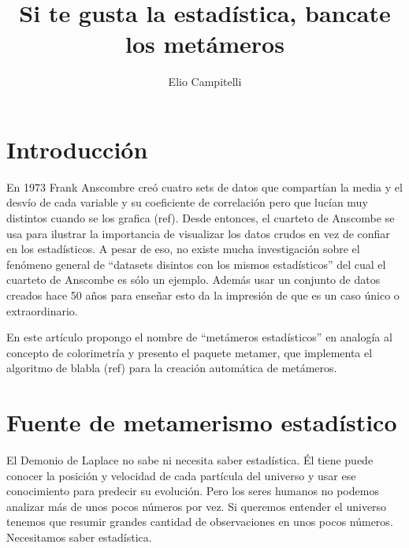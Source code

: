 \documentclass[runningheads,spanish]{llncs}
\begin{document}
%
\title{Si te gusta la estadística, bancate los metámeros}
%
%
\author{
Elio Campitelli }



%
\maketitle
%

 



\section{Introducción}

En 1973 Frank Anscombre creó cuatro sets de datos que compartían la
media y el desvío de cada variable y su coeficiente de correlación pero
que lucían muy distintos cuando se los grafica (ref). Desde entonces, el
cuarteto de Anscombe se usa para ilustrar la importancia de visualizar
los datos crudos en vez de confiar en los estadísticos. A pesar de eso,
no existe mucha investigación sobre el fenómeno general de ``datasets
disintos con los mismos estadísticos'' del cual el cuarteto de Anscombe
es sólo un ejemplo. Además usar un conjunto de datos creados hace 50
años para enseñar esto da la impresión de que es un caso único o
extraordinario.

En este artículo propongo el nombre de ``metámeros estadísticos'' en
analogía al concepto de colorimetría y presento el paquete metamer, que
implementa el algoritmo de blabla (ref) para la creación automática de
metámeros.

\section{Fuente de metamerismo estadístico}

El Demonio de Laplace no sabe ni necesita saber estadística. Él tiene
puede conocer la posición y velocidad de cada partícula del universo y
usar ese conocimiento para predecir su evolución. Pero los seres humanos
no podemos analizar más de unos pocos números por vez. Si queremos
entender el universo tenemos que resumir grandes cantidad de
observaciones en unos pocos números. Necesitamos saber estadística.
\end{document}
